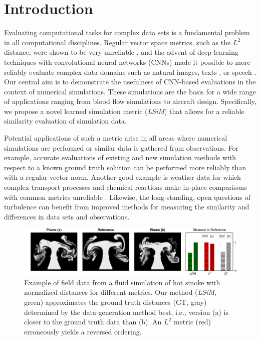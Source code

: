 \documentclass{article}
\begin{document}
\section{Introduction} \label{sec: intro}
Evaluating computational tasks for complex data sets is a fundamental problem in all computational disciplines. Regular vector space metrics, such as the $L^2$ distance, were shown to be very unreliable \citep{wang2004,zhang2018},
and the advent of deep learning techniques with convolutional neural networks (CNNs) made it possible to more reliably evaluate complex data domains such as natural images, texts \citep{benajiba2018}, or speech \citep{wang2018}.
Our central aim is to demonstrate the usefulness of CNN-based evaluations in the context of numerical simulations. These simulations are the basis for a wide range of applications ranging from blood flow simulations to aircraft design. Specifically, we propose a novel learned simulation metric (\textit{LSiM}) that allows for a reliable similarity evaluation of simulation data.

Potential applications of such a metric arise in all areas where numerical simulations are performed or similar data is gathered from observations. For example, accurate evaluations of existing and new simulation methods with respect to a known ground truth solution \citep{oberkampf2004} can be performed more reliably than with a regular vector norm. Another good example is weather data for which complex transport processes and chemical reactions make in-place comparisons with common metrics unreliable \citep{jolliffe2012}. Likewise, the long-standing, open questions of turbulence \citep{moin1998,lin1998} can benefit from improved methods for measuring the similarity and differences in data sets and observations.

\begin{figure}[ht]
    \centering
    \includegraphics[width=1.0\textwidth]{Images/Plumes}
    \vspace{-0.8cm}
    \caption{Example of field data from a fluid simulation of hot smoke with normalized distances for different metrics. Our method (\textit{LSiM}, green) approximates the ground truth distances (GT, gray) determined by the data generation method best, i.e., version (a) is closer to the ground truth data than (b). An $L^2$ metric (red) erroneously yields a reversed ordering.}
    \label{fig: visual similarity}
\end{figure}
\end{document}
